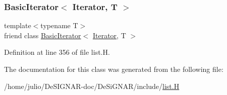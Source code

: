 \subsubsection{\texorpdfstring{Basic\+Iterator$<$ Iterator, T $>$}{BasicIterator< Iterator, T >}}
{\footnotesize\ttfamily template$<$typename T$>$ \\
friend class \hyperlink{class_designar_1_1_basic_iterator}{Basic\+Iterator}$<$ \hyperlink{class_designar_1_1_s_l_list_1_1_iterator}{Iterator}, T $>$\hspace{0.3cm}{\ttfamily [friend]}}



Definition at line 356 of file list.\+H.



The documentation for this class was generated from the following file\+:\begin{DoxyCompactItemize}
\item 
/home/julio/\+De\+S\+I\+G\+N\+A\+R-\/doc/\+De\+Si\+G\+N\+A\+R/include/\hyperlink{list_8_h}{list.\+H}\end{DoxyCompactItemize}

